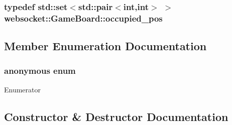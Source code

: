 \subsubsection[{\texorpdfstring{occupied\+\_\+pos}{occupied_pos}}]{\setlength{\rightskip}{0pt plus 5cm}typedef std\+::set$<$std\+::pair$<$int,int$>$ $>$ {\bf websocket\+::\+Game\+Board\+::occupied\+\_\+pos}\hspace{0.3cm}{\ttfamily [private]}}\hypertarget{classwebsocket_1_1GameBoard_ab68a03a083cfa75e7d5b21fe0c13eda3}{}\label{classwebsocket_1_1GameBoard_ab68a03a083cfa75e7d5b21fe0c13eda3}


\subsection{Member Enumeration Documentation}
\subsubsection[{\texorpdfstring{anonymous enum}{anonymous enum}}]{\setlength{\rightskip}{0pt plus 5cm}anonymous enum\hspace{0.3cm}{\ttfamily [private]}}\hypertarget{classwebsocket_1_1GameBoard_a84b7265b5db0109546eeadc332b10254}{}\label{classwebsocket_1_1GameBoard_a84b7265b5db0109546eeadc332b10254}
\begin{Desc}
\item[Enumerator]\par
\begin{description}
\item[{\em 
max\+\_\+recent\+\_\+msgs\hypertarget{classwebsocket_1_1GameBoard_a84b7265b5db0109546eeadc332b10254a1a669a5c5c208eebeb228bd6cbe3611b}{}\label{classwebsocket_1_1GameBoard_a84b7265b5db0109546eeadc332b10254a1a669a5c5c208eebeb228bd6cbe3611b}
}]\end{description}
\end{Desc}


\subsection{Constructor \& Destructor Documentation}
